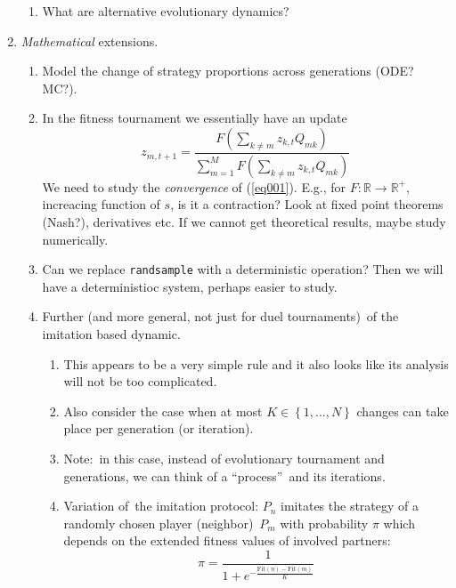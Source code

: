 \documentclass{article}%
\numberwithin{equation}{section}
\begin{document}
\begin{enumerate}
\begin{enumerate}
\item What are alternative evolutionary dynamics?
\end{enumerate}

\item \emph{Mathematical} extensions.

\begin{enumerate}
\item Model the change of strategy proportions across generations (ODE? MC?).

\item In the fitness tournament we essentially have an update
\begin{equation}
z_{m,t+1}=\frac{F\left(  \sum_{k\neq m}z_{k,t}Q_{mk}\right)  }{\sum_{m=1}%
^{M}F\left(  \sum_{k\neq m}z_{k,t}Q_{mk}\right)  } \label{eq001}%
\end{equation}
We need to study the \emph{convergence} of (\ref{eq001}). E.g., for
$F:\mathbb{R}\rightarrow\mathbb{R}^{+}$, increacing function of $s$, is it a
contraction? Look at fixed point theorems (Nash?), derivatives etc. If we
cannot get theoretical results, maybe study numerically.

\item Can we replace \texttt{randsample} with a deterministic operation? Then
we will have a deterministioc system, perhaps easier to study.

\item Further (and more general, not just for duel tournaments)\ of the
imitation based dynamic.

\begin{enumerate}
\item This appears to be a very simple rule and it also looks like its
analysis will not be too complicated.

\item Also consider the case when at most $K\in\left\{  1,...,N\right\}  $
changes can take place per generation (or iteration).

\item Note:\ in this case, instead of evolutionary tournament and generations,
we can think of a \textquotedblleft process\textquotedblright\ and its iterations.

\item Variation of\ the imitation protocol: $P_{n}$ imitates the strategy of a
randomly chosen player (neighbor)\ $P_{m}$ with probability $\pi$ which
depends on the extended fitness values of involved partners:%
\[
\pi=\frac{1}{1+e^{-\frac{\text{Fit}\left(  n\right)  -\text{Fit}\left(
m\right)  }{K}}}%
\]


\end{enumerate}
\end{enumerate}
\end{enumerate}
\end{document}
